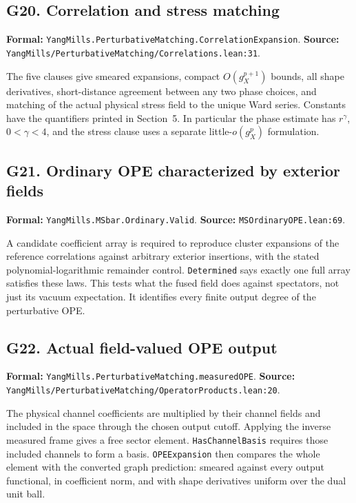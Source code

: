 \documentclass[11pt]{article}
\newcommand{\code}[1]{{\small\nolinkurl{#1}}}
\begin{document}
\subsection*{G20. Correlation and stress matching}
\label{gloss:G20}
\textbf{Formal:} \code{YangMills.PerturbativeMatching.CorrelationExpansion}.\newline
\textbf{Source:} \code{YangMills/PerturbativeMatching/Correlations.lean:31}.

The five clauses give smeared expansions, compact
$O(g_X^{p+1})$ bounds, all shape derivatives, short-distance
agreement between any two phase choices, and matching of the
actual physical stress field to the unique Ward series. Constants
have the quantifiers printed in Section~5. In particular the
phase estimate has $r^\gamma$, $0<\gamma<4$, and the stress clause
uses a separate little-$o(g_X^p)$ formulation.

\subsection*{G21. Ordinary OPE characterized by exterior fields}
\label{gloss:G21}
\textbf{Formal:} \code{YangMills.MSbar.Ordinary.Valid}.\newline
\textbf{Source:} \code{MSOrdinaryOPE.lean:69}.

A candidate coefficient array is required to reproduce cluster
expansions of the reference correlations against arbitrary exterior
insertions, with the stated polynomial-logarithmic remainder control.
\code{Determined} says exactly one full array satisfies these laws.
This tests what the fused field does against spectators, not just
its vacuum expectation. It identifies every finite output degree
of the perturbative OPE.

\subsection*{G22. Actual field-valued OPE output}
\label{gloss:G22}
\textbf{Formal:} \code{YangMills.PerturbativeMatching.measuredOPE}.\newline
\textbf{Source:} \code{YangMills/PerturbativeMatching/OperatorProducts.lean:20}.

The physical channel coefficients are multiplied by their
channel fields and included in the space through the chosen
output cutoff. Applying the inverse measured frame gives a free
sector element. \code{HasChannelBasis} requires those included
channels to form a basis. \code{OPEExpansion} then compares the
whole element with the converted graph prediction: smeared
against every output functional, in coefficient norm, and with
shape derivatives uniform over the dual unit ball.
\end{document}
